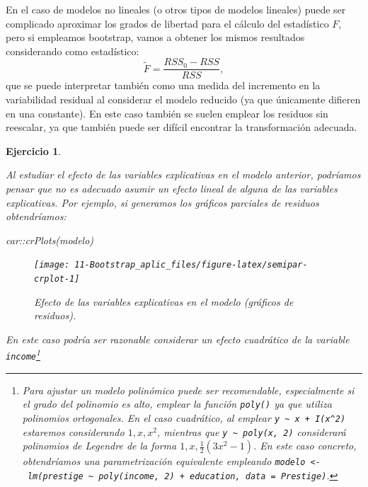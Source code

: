 \documentclass[
]{book}
\newenvironment{Shaded}{\begin{snugshade}}{\end{snugshade}}
\newcommand{\FunctionTok}[1]{\textcolor[rgb]{0.00,0.00,0.00}{#1}}
\newcommand{\NormalTok}[1]{#1}
\newcommand{\SpecialCharTok}[1]{\textcolor[rgb]{0.00,0.00,0.00}{#1}}
\theoremstyle{break}
\newtheorem{exercise}{Ejercicio}[chapter]
\theoremstyle{nonumberplain}
\begin{document}
En el caso de modelos no lineales (o otros tipos de modelos lineales) puede ser
complicado aproximar los grados de libertad para el cálculo del estadístico \(F\),
pero si empleamos bootstrap, vamos a obtener los mismos resultados considerando
como estadístico:
\[\tilde F =\frac{RSS_0 - RSS}{RSS},\]
que se puede interpretar también como una medida del incremento en la variabilidad residual
al considerar el modelo reducido (ya que únicamente difieren en una constante).
En este caso también se suelen emplear los residuos sin reescalar, ya que también puede ser
difícil encontrar la transformación adecuada.

\begin{exercise}
\protect\hypertarget{exr:test-semipar-cuadratico}{}\label{exr:test-semipar-cuadratico}

Al estudiar el efecto de las variables explicativas en el modelo
anterior, podríamos pensar que no es adecuado asumir un efecto lineal
de alguna de las variables explicativas. Por ejemplo, si generamos los gráficos
parciales de residuos obtendríamos:

\begin{Shaded}
\begin{Highlighting}[]
\NormalTok{car}\SpecialCharTok{::}\FunctionTok{crPlots}\NormalTok{(modelo)}
\end{Highlighting}
\end{Shaded}

\begin{figure}[!htb]

{\centering \texttt{[image: 11-Bootstrap\_aplic\_files/figure-latex/semipar-crplot-1]} 

}

\caption{Efecto de las variables explicativas en el modelo (gráficos de residuos).}\label{fig:semipar-crplot}
\end{figure}

En este caso podría ser razonable considerar un efecto cuadrático
de la variable \texttt{income}\footnote{Para ajustar un modelo polinómico
  puede ser recomendable, especialmente si el grado del polinomio es alto,
  emplear la función \texttt{poly()} ya que utiliza polinomios ortogonales.
  En el caso cuadrático, al emplear \texttt{y\ \textasciitilde{}\ x\ +\ I(x\^{}2)}
  estaremos considerando \(1, x, x^2\), mientras que \texttt{y\ \textasciitilde{}\ poly(x,\ 2)} considerará
  polinomios de Legendre de la forma \(1, x, \frac{1}{2}(3x^2-1)\).
  En este caso concreto, obtendríamos una parametrización equivalente
  empleando \texttt{modelo\ \textless{}-\ lm(prestige\ \textasciitilde{}\ poly(income,\ 2)\ +\ education,\ data\ =\ Prestige)}.}


\end{exercise}
\end{document}
